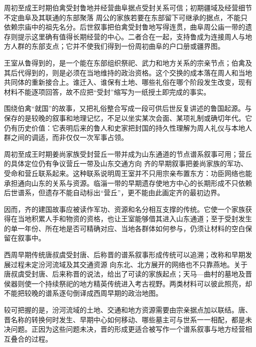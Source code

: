 \begin{event}{周初至成王时期}{伯禽受封鲁地并经营曲阜据点}{受封关系可信；初期疆域及经营细节不定}{曲阜及其联通的东部聚落}
周公的家族若要在东部留下可继承的据点，不能只依赖宗庙中的祖先名分。后世叙事把伯禽受封鲁地写得连贯，曲阜周公庙一带的遗存则提示这里确有值得长期经营的中心。二者合在一起，支持鲁成为连接周人与地方人群的东部支点；它并不使我们得到一份周初曲阜的户口册或疆界图。

王室从鲁得到的，是一个能在东部组织祭祀、武力和地方关系的宗亲节点；伯禽及其后代得到的，则是必须在当地维持的政治资格。这个交换的成本落在周人和当地共同体的重新接合上。谁迁入、谁保有土地、哪些礼俗在哪个阶段发生改变，现有材料不能逐项回答，故不应把“受封”缩写为一纸授土即完成的事实。
\end{event}

围绕伯禽“就国”的故事，又把礼俗整合写成一段可供后世反复讲述的鲁国起源。与保存的是较晚的叙事和地理记忆，不足以坐实某次会面、某项礼制或确切年代。它仍有历史价值：它表明后来的鲁人和史家把封国的持久性理解为周人礼仪与本地人群之间的调适，而非仅仅一次军事占领。

\begin{event}{周初至成王时期}{姜尚家族受封营丘一带并成为山东通道的节点}{谱系叙事可用；营丘的具体定位仍有争议}{营丘一带及山东交通方向}
齐的早期叙事把姜尚家族的军功、受命和营丘联系起来。这种联系说明周王室并不只用宗亲布置东方：功臣网络也能承担通向山东的关系与资源。临淄一带的早期遗存使地方中心的长期形成不只依赖后世谱系，但遗存不能自动标出“营丘”，更不能由此画定齐的最初边界。

因而，齐的建国故事应被读作军功、资源和名分相互支撑的传统。它使一个家族获得在当地积累人手和物资的资格，也让王室能够借其进入山东通道；至于受封发生的单一年份、所在地是否可精确对应、当地各群体如何参与，仍须让材料的空白保留在叙事中。
\end{event}

\begin{event}{西周早期传统}{唐叔虞受封唐、后称晋的谱系叙事形成}{传统可以追溯；改称和早期发展过程未定}{汾河流域及其交通资源}
向东北、北方展开的网络也不只靠燕地。关于唐叔虞受封唐、后来称晋的说法，给出了可读的家族起点；天马—曲村的墓地及晋侯器则使一个持续祭祀的地方精英传统进入考古视野。两类材料可以彼此照亮，却不能把较晚的谱系逐句倒译成西周早期的政治地图。

较可把握的是，汾河流域的土地、交通和地方资源需要由宗亲据点加以联结。唐、晋名称的转换何时发生、早期中心如何移动、哪些墓主可与世系一一相配，都是未决问题。正因为这些问题未决，晋的形成更适合被写作一个谱系叙事与地方经营相互叠合的过程。
\end{event}

